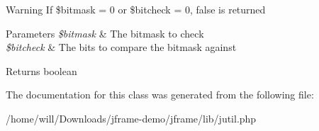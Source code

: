 \begin{DoxyWarning}{Warning}
If \$bitmask = 0 or \$bitcheck = 0, false is returned 
\end{DoxyWarning}

\begin{DoxyParams}{Parameters}
{\em \$bitmask} & The bitmask to check \\
\hline
{\em \$bitcheck} & The bits to compare the bitmask against \\
\hline
\end{DoxyParams}
\begin{DoxyReturn}{Returns}
boolean 
\end{DoxyReturn}


The documentation for this class was generated from the following file\-:\begin{DoxyCompactItemize}
\item 
/home/will/\-Downloads/jframe-\/demo/jframe/lib/jutil.\-php\end{DoxyCompactItemize}
